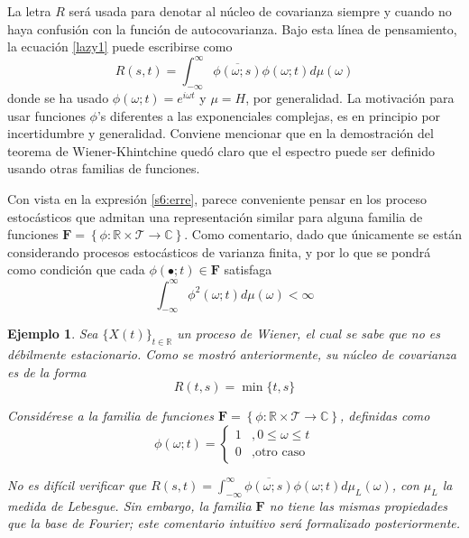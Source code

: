 \documentclass[12pt,letterpaper]{book}
\newtheorem{ejemplo}{Ejemplo}[chapter]
\newcommand{\R}{\mathbb{R}}
\newcommand{\C}{\mathbb{C}}
\newcommand{\intR}{\int_{-\infty}^{\infty}}
\newcommand{\ef}{\mathbf{F}}
\newcommand{\xtin}[1]{$\{X(t)\}_{t\in \mathcal{ #1 }}$ }
\begin{document}
La letra $R$ será usada para denotar al núcleo de covarianza siempre y cuando no haya confusión con la función de autocovarianza. 
%
Bajo esta línea de pensamiento, 
%
la ecuación \ref{lazy1} puede escribirse como
\begin{equation}
R(s,t) = \intR \overline{\phi(\omega;s)}\phi(\omega;t) d\mu(\omega)
\label{s6:erre}
\end{equation}
donde se ha usado $\phi(\omega; t) = e^{i \omega t}$ y $\mu = H$, por generalidad.
%
La motivación para usar funciones $\phi$'s diferentes a las exponenciales complejas, es en principio por incertidumbre y generalidad.
%
Conviene mencionar que en la demostración del teorema de Wiener-Khintchine quedó claro que el espectro puede ser definido usando otras familias de funciones.

Con vista en la expresión \ref{s6:erre}, parece conveniente pensar en los proceso estocásticos que admitan una representación similar para alguna familia de funciones $\ef = \left\{ \phi: \R \times \mathcal{T} \rightarrow \C \right\}$. 
%
Como comentario, dado que únicamente se están considerando procesos estocásticos de varianza finita, y 
por lo que se
pondrá como condición que cada $\phi(\bullet;t) \in \ef$ satisfaga
\begin{equation}
\intR \phi^{2}(\omega;t) d\mu(\omega) < \infty
\end{equation}

\begin{ejemplo}
Sea \xtin{\R} un proceso de Wiener, el cual se sabe que no es débilmente estacionario.
%
Como se mostró anteriormente, su núcleo de covarianza es de la forma
\begin{equation}
R(t,s) = \min \{ t , s \}
\end{equation}

Considérese a la familia de funciones $\ef = \left\{ \phi: \R \times \mathcal{T} \rightarrow \C \right\}$, definidas como
\begin{equation}
\phi(\omega; t) = \begin{cases}
1 &, 0 \leq \omega \leq t \\
0 &, \text{otro caso}
\end{cases}
\end{equation}

No es difícil verificar que $R(s,t) = \intR \overline{\phi(\omega;s)}\phi(\omega;t) d\mu_L(\omega)$, con $\mu_L$ la medida de Lebesgue.
%
Sin embargo, la familia $\ef$ no tiene las mismas propiedades que la base de Fourier; este comentario intuitivo será formalizado posteriormente.
\end{ejemplo}
\end{document}

